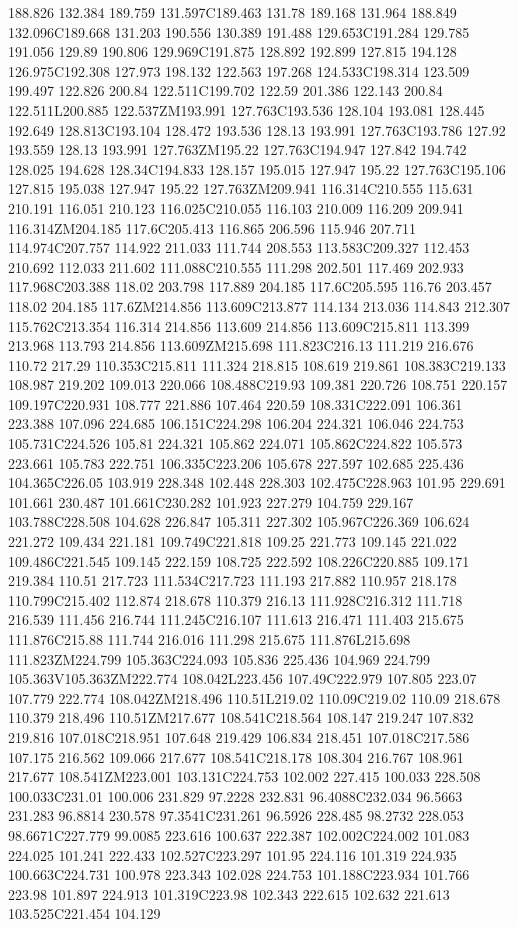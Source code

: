 188.826 132.384 189.759 131.597C189.463 131.78 189.168 131.964 188.849 132.096C189.668 131.203 190.556 130.389 191.488 129.653C191.284 129.785 191.056 129.89 190.806 129.969C191.875 128.892 192.899 127.815 194.128 126.975C192.308 127.973 198.132 122.563 197.268 124.533C198.314 123.509 199.497 122.826 200.84 122.511C199.702 122.59 201.386 122.143 200.84 122.511L200.885 122.537ZM193.991 127.763C193.536 128.104 193.081 128.445 192.649 128.813C193.104 128.472 193.536 128.13 193.991 127.763C193.786 127.92 193.559 128.13 193.991 127.763ZM195.22 127.763C194.947 127.842 194.742 128.025 194.628 128.34C194.833 128.157 195.015 127.947 195.22 127.763C195.106 127.815 195.038 127.947 195.22 127.763ZM209.941 116.314C210.555 115.631 210.191 116.051 210.123 116.025C210.055 116.103 210.009 116.209 209.941 116.314ZM204.185 117.6C205.413 116.865 206.596 115.946 207.711 114.974C207.757 114.922 211.033 111.744 208.553 113.583C209.327 112.453 210.692 112.033 211.602 111.088C210.555 111.298 202.501 117.469 202.933 117.968C203.388 118.02 203.798 117.889 204.185 117.6C205.595 116.76 203.457 118.02 204.185 117.6ZM214.856 113.609C213.877 114.134 213.036 114.843 212.307 115.762C213.354 116.314 214.856 113.609 214.856 113.609C215.811 113.399 213.968 113.793 214.856 113.609ZM215.698 111.823C216.13 111.219 216.676 110.72 217.29 110.353C215.811 111.324 218.815 108.619 219.861 108.383C219.133 108.987 219.202 109.013 220.066 108.488C219.93 109.381 220.726 108.751 220.157 109.197C220.931 108.777 221.886 107.464 220.59 108.331C222.091 106.361 223.388 107.096 224.685 106.151C224.298 106.204 224.321 106.046 224.753 105.731C224.526 105.81 224.321 105.862 224.071 105.862C224.822 105.573 223.661 105.783 222.751 106.335C223.206 105.678 227.597 102.685 225.436 104.365C226.05 103.919 228.348 102.448 228.303 102.475C228.963 101.95 229.691 101.661 230.487 101.661C230.282 101.923 227.279 104.759 229.167 103.788C228.508 104.628 226.847 105.311 227.302 105.967C226.369 106.624 221.272 109.434 221.181 109.749C221.818 109.25 221.773 109.145 221.022 109.486C221.545 109.145 222.159 108.725 222.592 108.226C220.885 109.171 219.384 110.51 217.723 111.534C217.723 111.193 217.882 110.957 218.178 110.799C215.402 112.874 218.678 110.379 216.13 111.928C216.312 111.718 216.539 111.456 216.744 111.245C216.107 111.613 216.471 111.403 215.675 111.876C215.88 111.744 216.016 111.298 215.675 111.876L215.698 111.823ZM224.799 105.363C224.093 105.836 225.436 104.969 224.799 105.363V105.363ZM222.774 108.042L223.456 107.49C222.979 107.805 223.07 107.779 222.774 108.042ZM218.496 110.51L219.02 110.09C219.02 110.09 218.678 110.379 218.496 110.51ZM217.677 108.541C218.564 108.147 219.247 107.832 219.816 107.018C218.951 107.648 219.429 106.834 218.451 107.018C217.586 107.175 216.562 109.066 217.677 108.541C218.178 108.304 216.767 108.961 217.677 108.541ZM223.001 103.131C224.753 102.002 227.415 100.033 228.508 100.033C231.01 100.006 231.829 97.2228 232.831 96.4088C232.034 96.5663 231.283 96.8814 230.578 97.3541C231.261 96.5926 228.485 98.2732 228.053 98.6671C227.779 99.0085 223.616 100.637 222.387 102.002C224.002 101.083 224.025 101.241 222.433 102.527C223.297 101.95 224.116 101.319 224.935 100.663C224.731 100.978 223.343 102.028 224.753 101.188C223.934 101.766 223.98 101.897 224.913 101.319C223.98 102.343 222.615 102.632 221.613 103.525C221.454 104.129 